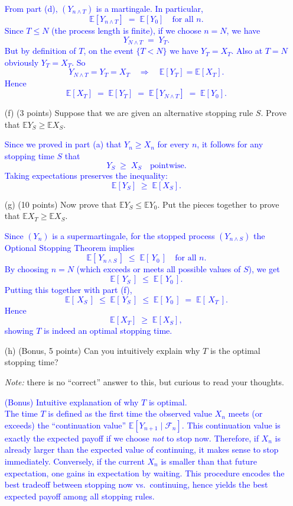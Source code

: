 \documentclass{article}
\begin{document}
\begin{enumerate}
        \textcolor{blue}{
            From part (d), $(Y_{n\wedge T})$ is a martingale. In particular,
\[
\mathbb{E}[Y_{n\wedge T}] 
\;=\;
\mathbb{E}[Y_0] 
\quad
\text{for all } n.
\]
Since $T \le N$ (the process length is finite), if we choose $n = N$, we have
\[
Y_{N\wedge T} \;=\; Y_T.
\]
But by definition of $T$, on the event $\{T < N\}$ we have $Y_T = X_T$. Also at $T=N$ obviously $Y_T = X_T$. So
\[
Y_{N\wedge T} = Y_T = X_T
\quad\Longrightarrow\quad
\mathbb{E}[Y_T] = \mathbb{E}[X_T].
\]
Hence
\[
\mathbb{E}[X_T]
\;=\;
\mathbb{E}[Y_T]
\;=\;
\mathbb{E}[Y_{N \wedge T}]
\;=\;
\mathbb{E}[Y_0].
\]
        }
    
    \item[(f)] (3 points) Suppose that we are given an alternative stopping rule $S$. Prove that $\mathbb{E}Y_S \geq \mathbb{E}X_S$.

    \textcolor{blue}{
        Since we proved in part (a) that $Y_n \ge X_n$ for every $n$, it follows for any stopping time $S$ that
\[
Y_S \;\ge\; X_S
\quad
\text{pointwise.}
\]
Taking expectations preserves the inequality:
\[
\mathbb{E}[Y_S]
\;\ge\;
\mathbb{E}[X_S].
\]
    }
    
    \item[(g)] (10 points) Now prove that $\mathbb{E}Y_S \leq \mathbb{E}Y_0$. Put the pieces together to prove that $\mathbb{E}X_T \geq \mathbb{E}X_S$.

        \textcolor{blue}{
            Since $(Y_n)$ is a supermartingale, for the stopped process $(Y_{n\wedge S})$ the Optional Stopping Theorem implies
\[
\mathbb{E}[\,Y_{n\wedge S}\,] \;\le\; \mathbb{E}[\,Y_0\,]
\quad
\text{for all }n.
\]
By choosing $n=N$ (which exceeds or meets all possible values of $S$), we get
\[
\mathbb{E}[\,Y_S\,]
\;\le\;
\mathbb{E}[\,Y_0\,].
\]
Putting this together with part (f), 
\[
\mathbb{E}[\,X_S\,] \;\le\; \mathbb{E}[\,Y_S\,] \;\le\; \mathbb{E}[\,Y_0\,] \;=\; \mathbb{E}[\,X_T\,].
\]
Hence
\[
\mathbb{E}[X_T]
\;\ge\;
\mathbb{E}[X_S],
\]
showing $T$ is indeed an optimal stopping time.
        }
    
    \item[(h)] (Bonus, 5 points) Can you intuitively explain why $T$ is the optimal stopping time?

    \textit{Note:} there is no ``correct'' answer to this, but curious to read your thoughts.

    \textcolor{blue}{ (Bonus) Intuitive explanation of why $T$ is optimal. \\
        The time $T$ is defined as the first time the observed value $X_n$
        meets (or exceeds) the ``continuation value'' $\mathbb{E}[Y_{n+1}\mid
        \mathcal{F}_n]$. This continuation value is exactly the expected payoff
        if we choose \emph{not} to stop now. Therefore, if $X_n$ is already
        larger than the expected value of continuing, it makes sense to stop
        immediately. Conversely, if the current $X_n$ is smaller than that
        future expectation, one gains in expectation by waiting. This procedure
        encodes the best tradeoff between stopping now vs.\ continuing, hence
        yields the best expected payoff among all stopping rules. }


\end{enumerate}
\end{document}

